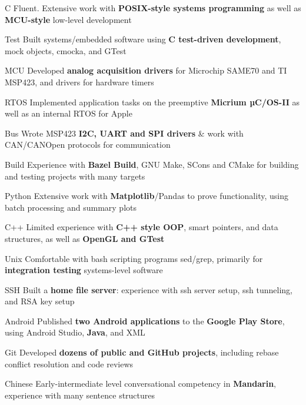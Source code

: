 \begin{cvskills}

 \cvskill
    {C} %
    {Fluent. Extensive work with \textbf{POSIX-style systems programming} as well as \textbf{MCU-style} low-level development}%

 \cvskill
    {Test} %
    {Built systems/embedded software using \textbf{C test-driven development}, mock objects, cmocka, and GTest} %

 \cvskill
    {MCU} %
    {Developed \textbf{analog acquisition drivers} for Microchip SAME70 and TI MSP423, and drivers for hardware timers} %

 \cvskill
    {RTOS} %
    {Implemented application tasks on the preemptive \textbf{Micrium µC/OS-II} as well as an internal RTOS for Apple  } %

 \cvskill
    {Bus} %
    {Wrote MSP423 \textbf{I2C, UART and SPI drivers} \& work with CAN/CANOpen protocols for communication}

 \cvskill
    {Build} %
    {Experience with \textbf{Bazel Build}, GNU Make, SCons and CMake for building and testing projects with many targets} %

 \cvskill
    {Python} %
    {Extensive work with \textbf{Matplotlib}/Pandas to prove functionality, using batch processing and summary plots} 

 \cvskill
    {C++} %
    {Limited experience with \textbf{C++ style OOP}, smart pointers, and data structures, as well as \textbf{OpenGL and GTest}}%
    
 \cvskill
    {Unix} %
    {Comfortable with bash scripting programs sed/grep, primarily for \textbf{integration testing} systems-level software} %

 \cvskill
    {SSH} %
    {Built a \textbf{home file server}: experience with ssh server setup, ssh tunneling, and RSA key setup} %

 \cvskill
    {Android} %
    {Published \textbf{two Android applications} to the \textbf{Google Play Store}, using Android Studio, \textbf{Java}, and XML} %

 



 \cvskill
    {Git} %
    {Developed \textbf{dozens of public and GitHub projects}, including rebase conflict resolution and code reviews} %

\cvskill
   {Chinese} %
   {Early-intermediate level conversational competency in \textbf{Mandarin}, experience with many sentence structures   } %


\end{cvskills}

